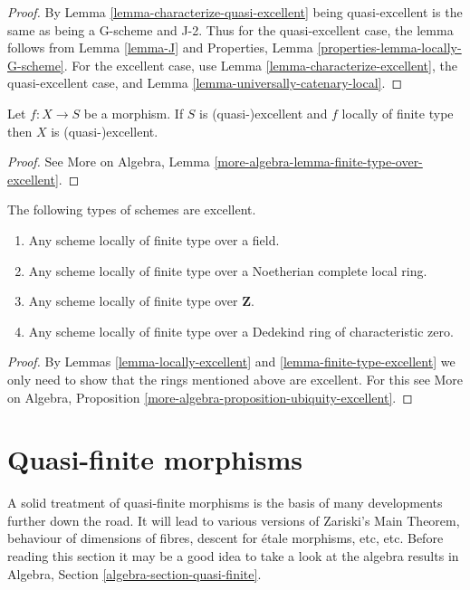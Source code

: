 \begin{proof}
By Lemma \ref{lemma-characterize-quasi-excellent} being
quasi-excellent is the same as being a G-scheme and J-2.
Thus for the quasi-excellent case, the lemma follows from
Lemma \ref{lemma-J} and
Properties, Lemma \ref{properties-lemma-locally-G-scheme}.
For the excellent case, use Lemma \ref{lemma-characterize-excellent},
the quasi-excellent case, and Lemma \ref{lemma-universally-catenary-local}.
\end{proof}

\begin{lemma}
\label{lemma-finite-type-excellent}
Let $f : X \to S$ be a morphism.
If $S$ is (quasi-)excellent and $f$ locally of finite type then
$X$ is (quasi-)excellent.
\end{lemma}

\begin{proof}
See More on Algebra, Lemma \ref{more-algebra-lemma-finite-type-over-excellent}.
\end{proof}

\begin{lemma}
\label{lemma-ubiquity-excellent}
The following types of schemes are excellent.
\begin{enumerate}
\item Any scheme locally of finite type over a field.
\item Any scheme locally of finite type over a Noetherian complete local ring.
\item Any scheme locally of finite type over $\mathbf{Z}$.
\item Any scheme locally of finite type over a Dedekind ring of
characteristic zero.
\end{enumerate}
\end{lemma}

\begin{proof}
By Lemmas \ref{lemma-locally-excellent} and \ref{lemma-finite-type-excellent}
we only need to show that the rings mentioned above are excellent.
For this see
More on Algebra, Proposition \ref{more-algebra-proposition-ubiquity-excellent}.
\end{proof}






\section{Quasi-finite morphisms}
\label{section-quasi-finite}

\noindent
A solid treatment of quasi-finite morphisms is the basis of many developments
further down the road. It will lead to various versions of Zariski's Main
Theorem, behaviour of dimensions of fibres, descent for \'etale morphisms, etc,
etc. Before reading this section it may be a good idea to take a look at
the algebra results in Algebra, Section \ref{algebra-section-quasi-finite}.

